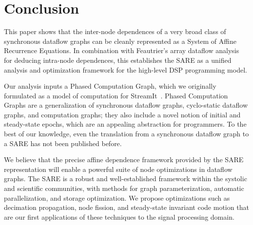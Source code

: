 \section{Conclusion}

This paper shows that the inter-node dependences of a very broad class
of synchronous dataflow graphs can be cleanly represented as a System
of Affine Recurrence Equations.  In combination with Feautrier's array
dataflow analysis~\cite{Feautrier01} for deducing intra-node
dependences, this establishes the SARE as a unified analysis and
optimization framework for the high-level DSP programming model.

Our analysis inputs a Phased Computation Graph, which we originally
formulated as a model of computation for StreamIt~\cite{streamitcc}.
Phased Computation Graphs are a generalization of synchronous dataflow
graphs, cyclo-static dataflow graphs, and computation graphs; they
also include a novel notion of initial and steady-state epochs, which
are an appealing abstraction for programmers.  To the best of our
knowledge, even the translation from a synchronous dataflow graph to a
SARE has not been published before.

We believe that the precise affine dependence framework provided by
the SARE representation will enable a powerful suite of node
optimizations in dataflow graphs.  The SARE is a robust and
well-established framework within the systolic and scientific
communities, with methods for graph parameterization, automatic
parallelization, and storage optimization.  We propose optimizations
such as decimation propagation, node fission, and steady-state
invariant code motion that are our first applications of these
techniques to the signal processing domain.

